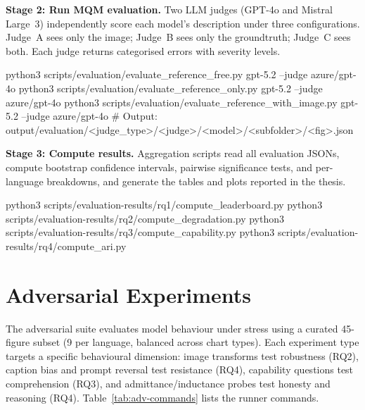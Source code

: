 \noindent\textbf{Stage 2: Run MQM evaluation.} Two LLM judges (GPT-4o and Mistral Large~3) independently score each model's description under three configurations. Judge~A sees only the image; Judge~B sees only the groundtruth; Judge~C sees both. Each judge returns categorised errors with severity levels.
\begin{codebox}[title={\scriptsize MQM Evaluation}]
{\scriptsize python3 scripts/evaluation/evaluate_reference_free.py gpt-5.2 --judge azure/gpt-4o
python3 scripts/evaluation/evaluate_reference_only.py gpt-5.2 --judge azure/gpt-4o
python3 scripts/evaluation/evaluate_reference_with_image.py gpt-5.2 --judge azure/gpt-4o
# Output: output/evaluation/<judge_type>/<judge>/<model>/<subfolder>/<fig>.json}
\end{codebox}

\noindent\textbf{Stage 3: Compute results.} Aggregation scripts read all evaluation JSONs, compute bootstrap confidence intervals, pairwise significance tests, and per-language breakdowns, and generate the tables and plots reported in the thesis.
\begin{codebox}[title={\scriptsize Results computation}]
{\scriptsize python3 scripts/evaluation-results/rq1/compute_leaderboard.py
python3 scripts/evaluation-results/rq2/compute_degradation.py
python3 scripts/evaluation-results/rq3/compute_capability.py
python3 scripts/evaluation-results/rq4/compute_ari.py}
\end{codebox}

\section{Adversarial Experiments}

The adversarial suite evaluates model behaviour under stress using a curated 45-figure subset (9 per language, balanced across chart types). Each experiment type targets a specific behavioural dimension: image transforms test robustness (RQ2), caption bias and prompt reversal test resistance (RQ4), capability questions test comprehension (RQ3), and admittance/inductance probes test honesty and reasoning (RQ4). Table~\ref{tab:adv-commands} lists the runner commands.

